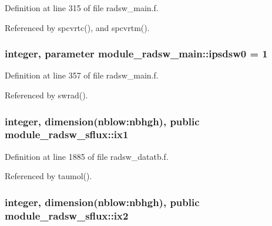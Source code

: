 Definition at line 315 of file radsw\+\_\+main.\+f.



Referenced by spcvrtc(), and spcvrtm().

\subsubsection[{\texorpdfstring{ipsdsw0}{ipsdsw0}}]{\setlength{\rightskip}{0pt plus 5cm}integer, parameter module\+\_\+radsw\+\_\+main\+::ipsdsw0 = 1\hspace{0.3cm}{\ttfamily [private]}}\hypertarget{group__module__radsw__main_gae1f88a0b60d69b892cfae83bb9ab67df}{}\label{group__module__radsw__main_gae1f88a0b60d69b892cfae83bb9ab67df}


Definition at line 357 of file radsw\+\_\+main.\+f.



Referenced by swrad().

\subsubsection[{\texorpdfstring{ix1}{ix1}}]{\setlength{\rightskip}{0pt plus 5cm}integer, dimension(nblow\+:nbhgh), public module\+\_\+radsw\+\_\+sflux\+::ix1}\hypertarget{group__module__radsw__main_gac2864b4501e9bc3804d45d14f4aab472}{}\label{group__module__radsw__main_gac2864b4501e9bc3804d45d14f4aab472}


Definition at line 1885 of file radsw\+\_\+datatb.\+f.



Referenced by taumol().

\subsubsection[{\texorpdfstring{ix2}{ix2}}]{\setlength{\rightskip}{0pt plus 5cm}integer, dimension(nblow\+:nbhgh), public module\+\_\+radsw\+\_\+sflux\+::ix2}\hypertarget{group__module__radsw__main_ga92703c3e826f7e81267c6b7ae31ebe42}{}\label{group__module__radsw__main_ga92703c3e826f7e81267c6b7ae31ebe42}


